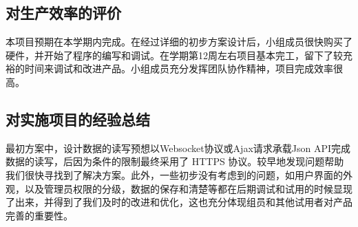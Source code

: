 \documentclass[UTF8]{ctexart}
\begin{document}
\subsection{对生产效率的评价}
本项目预期在本学期内完成。在经过详细的初步方案设计后，小组成员很快购买了硬件，并开始了程序的编写和调试。在学期第12周左右项目基本完工，留下了较充裕的时间来调试和改进产品。小组成员充分发挥团队协作精神，项目完成效率很高。

\subsection{对实施项目的经验总结}
最初方案中，设计数据的读写预想以Websocket协议或Ajax请求承载Json API完成数据的读写，后因为条件的限制最终采用了 HTTPS 协议。较早地发现问题帮助我们很快寻找到了解决方案。此外，一些初步没有考虑到的问题，如用户界面的外观，以及管理员权限的分级，数据的保存和清楚等都在后期调试和试用的时候显现了出来，并得到了我们及时的改进和优化，这也充分体现组员和其他试用者对产品完善的重要性。
\end{document}
